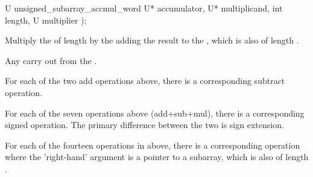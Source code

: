 \begin{itemdecl}
U unsigned_subarray_accmul_word U* accumulator, U* multiplicand, int length, U multiplier );    
\end{itemdecl}

\begin{itemdescr}
\effects Multiply the  of length  by the  adding the result to the , which is also of length .

\returns Any carry out from the .    
\end{itemdescr}

For each of the two add operations above, there is a corresponding subtract operation.

For each of the seven operations above (add+sub+mul), there is a corresponding signed operation. The primary difference between the two is sign extension.

For each of the fourteen operations in above, there is a corresponding operation where the 'right-hand' argument is a pointer to a subarray, which is also of length .